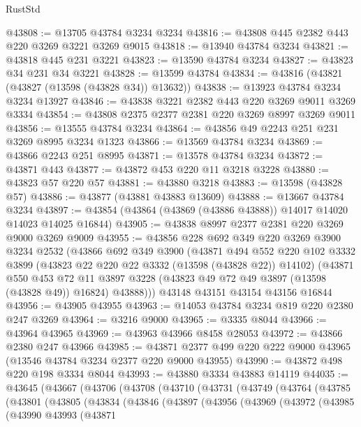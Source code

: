 \begin{lexlean}{RustStd}
\begin{coremodule}
@43808 := @13705 @43784 @3234 @3234
@43816 := @43808 @445 @2382 @443 @220 @3269 @3221 @3269 @9015
@43818 := @13940 @43784 @3234
@43821 := @43818 @445 @231 @3221
@43823 := @13590 @43784 @3234
@43827 := @43823 @34 @231 @34 @3221
@43828 := @13599 @43784
@43834 := @43816 (@43821 (@43827 (@13598 (@43828 @34)) @13632))
@43838 := @13923 @43784 @3234 @3234 @13927
@43846 := @43838 @3221 @2382 @443 @220 @3269 @9011 @3269 @3334
@43854 := @43808 @2375 @2377 @2381 @220 @3269 @8997 @3269 @9011
@43856 := @13555 @43784 @3234
@43864 := @43856 @49 @2243 @251 @231 @3269 @8995 @3234 @1323
@43866 := @13569 @43784 @3234
@43869 := @43866 @2243 @251 @8995
@43871 := @13578 @43784 @3234
@43872 := @43871 @443
@43877 := @43872 @453 @220 @11 @3218 @3228
@43880 := @43823 @57 @220 @57
@43881 := @43880 @3218
@43883 := @13598 (@43828 @57)
@43886 := @43877 (@43881 @43883 @13609)
@43888 := @13667 @43784 @3234
@43897 := @43854 (@43864 (@43869 (@43886 @43888)) @14017 @14020 @14023 @14025 @16844)
@43905 := @43838 @8997 @2377 @2381 @220 @3269 @9000 @3269 @9009
@43955 := @43856
    @228
    @692
    @349
    @220
    @3269
    @3900
    @3234
    @2532
    (@43866
      @692
      @349
      @3900
      (@43871
        @494
        @552
        @220
        @102
        @3332
        @3899
        (@43823 @22 @220 @22 @3332 (@13598 (@43828 @22)) @14102)
        (@43871
          @550
          @453
          @72
          @11
          @3897
          @3228
          (@43823 @49 @72 @49 @3897 (@13598 (@43828 @49)) @16824)
          @43888)))
    @43148
    @43151
    @43154
    @43156
    @16844
@43956 := @43905 @43955
@43963 := @14053 @43784 @3234 @819 @220 @2380 @247 @3269
@43964 := @3216 @9000
@43965 := @3335 @8044
@43966 := @43964 @43965
@43969 := @43963 @43966 @8458 @28053
@43972 := @43866 @2380 @247 @43966
@43985 := @43871 @2377 @499 @220 @222 @9000 @43965 (@13546 @43784 @3234 @2377 @220 @9000 @43955)
@43990 := @43872 @498 @220 @198 @3334 @8044
@43993 := @43880 @3334 @43883 @14119
@44035 := @43645
    (@43667
      (@43706
        (@43708
          (@43710
            (@43731
              (@43749
                (@43764
                  (@43785
                    (@43801
                      (@43805
                        (@43834
                          (@43846
                            (@43897
                              (@43956
                                (@43969
                                  (@43972
                                    (@43985
                                      (@43990
                                        @43993
                                        (@43871

\end{coremodule}
\end{lexlean}
